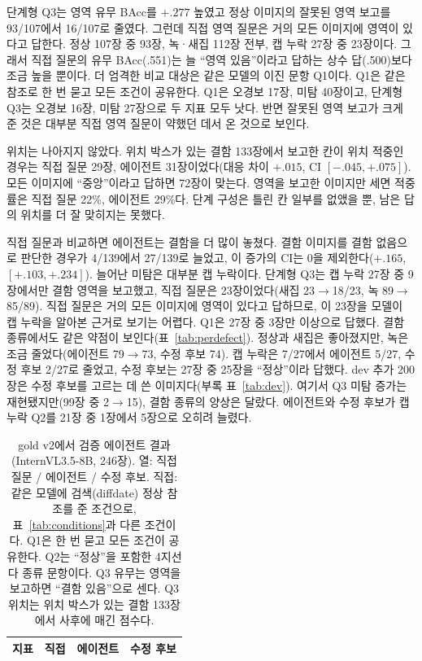\documentclass[11pt]{article}
\begin{document}
단계형 Q3는 영역 유무 BAcc를 $+.277$ 높였고 정상 이미지의 잘못된 영역 보고를 93/107에서 16/107로 줄였다. 그런데 직접 영역 질문은 거의 모든 이미지에 영역이 있다고 답한다. 정상 107장 중 93장, 녹·새집 112장 전부, 캡 누락 27장 중 23장이다. 그래서 직접 질문의 유무 BAcc(.551)는 늘 ``영역 있음''이라고 답하는 상수 답(.500)보다 조금 높을 뿐이다. 더 엄격한 비교 대상은 같은 모델의 이진 문항 Q1이다. Q1은 같은 참조로 한 번 묻고 모든 조건이 공유한다. Q1은 오경보 17장, 미탐 40장이고, 단계형 Q3는 오경보 16장, 미탐 27장으로 두 지표 모두 낫다. 반면 잘못된 영역 보고가 크게 준 것은 대부분 직접 영역 질문이 약했던 데서 온 것으로 보인다.

위치는 나아지지 않았다. 위치 박스가 있는 결함 133장에서 보고한 칸이 위치 적중인 경우는 직접 질문 29장, 에이전트 31장이었다(대응 차이 $+.015$, CI $[-.045,+.075]$). 모든 이미지에 ``중앙''이라고 답하면 72장이 맞는다. 영역을 보고한 이미지만 세면 적중률은 직접 질문 22\%, 에이전트 29\%다. 단계 구성은 틀린 칸 일부를 없앴을 뿐, 남은 답의 위치를 더 잘 맞히지는 못했다.

직접 질문과 비교하면 에이전트는 결함을 더 많이 놓쳤다. 결함 이미지를 결함 없음으로 판단한 경우가 4/139에서 27/139로 늘었고, 이 증가의 CI는 0을 제외한다($+.165$, $[+.103,+.234]$). 늘어난 미탐은 대부분 캡 누락이다. 단계형 Q3는 캡 누락 27장 중 9장에서만 결함 영역을 보고했고, 직접 질문은 23장이었다(새집 23$\rightarrow$18/23, 녹 89$\rightarrow$85/89). 직접 질문은 거의 모든 이미지에 영역이 있다고 답하므로, 이 23장을 모델이 캡 누락을 알아본 근거로 보기는 어렵다. Q1은 27장 중 3장만 이상으로 답했다. 결함 종류에서도 같은 약점이 보인다(표~\ref{tab:perdefect}). 정상과 새집은 좋아졌지만, 녹은 조금 줄었다(에이전트 79$\rightarrow$73, 수정 후보 74). 캡 누락은 7/27에서 에이전트 5/27, 수정 후보 2/27로 줄었고, 수정 후보는 27장 중 25장을 ``정상''이라 답했다. dev 추가 200장은 수정 후보를 고르는 데 쓴 이미지다(부록 표~\ref{tab:dev}). 여기서 Q3 미탐 증가는 재현됐지만(99장 중 2$\rightarrow$15), 결함 종류의 양상은 달랐다. 에이전트와 수정 후보가 캡 누락 Q2를 21장 중 1장에서 5장으로 오히려 늘렸다.

\begin{table}[t]
\centering
\caption{gold v2에서 검증 에이전트 결과(InternVL3.5-8B, 246장). 열: 직접 질문 / 에이전트 / 수정 후보. 직접: 같은 모델에 검색(diffdate) 정상 참조를 준 조건으로, 표~\ref{tab:conditions}과 다른 조건이다. Q1은 한 번 묻고 모든 조건이 공유한다. Q2는 ``정상''을 포함한 4지선다 종류 문항이다. Q3 유무는 영역을 보고하면 ``결함 있음''으로 센다. Q3 위치는 위치 박스가 있는 결함 133장에서 사후에 매긴 점수다.}
\label{tab:agent}
\begin{tabular}{lrrr}
\toprule
지표 & 직접 & 에이전트 & 수정 후보 \\
\midrule

\bottomrule
\end{tabular}
\end{table}
\end{document}
